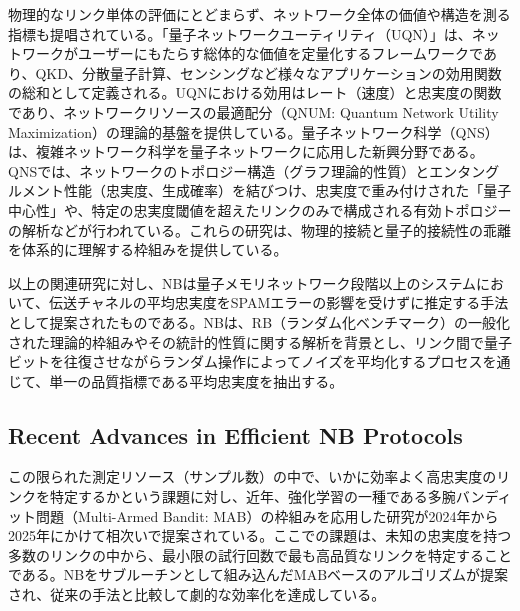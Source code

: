 \documentclass[12pt,a4paper,titlepage,dvipdfmx]{article}
\begin{document}
物理的なリンク単体の評価にとどまらず、ネットワーク全体の価値や構造を測る指標も提唱されている。「量子ネットワークユーティリティ（UQN）」は、ネットワークがユーザーにもたらす総体的な価値を定量化するフレームワークであり、QKD、分散量子計算、センシングなど様々なアプリケーションの効用関数の総和として定義される。UQN\cite{vardoyan2024quantum}における効用はレート（速度）と忠実度の関数であり、ネットワークリソースの最適配分（QNUM: Quantum Network Utility Maximization）の理論的基盤を提供している。量子ネットワーク科学（QNS）は、複雑ネットワーク科学を量子ネットワークに応用した新興分野である\cite{biamonte2019complex}。QNSでは、ネットワークのトポロジー構造（グラフ理論的性質）とエンタングルメント性能（忠実度、生成確率）を結びつけ、忠実度で重み付けされた「量子中心性」や、特定の忠実度閾値を超えたリンクのみで構成される有効トポロジーの解析などが行われている\cite{cuquet2009entanglement}。これらの研究は、物理的接続と量子的接続性の乖離を体系的に理解する枠組みを提供している。

以上の関連研究に対し、NBは量子メモリネットワーク段階以上のシステムにおいて、伝送チャネルの平均忠実度をSPAMエラーの影響を受けずに推定する手法として提案されたものである\cite{helsen2023benchmarking}。NBは、RB（ランダム化ベンチマーク）の一般化された理論的枠組み\cite{helsen2022general}やその統計的性質に関する解析\cite{harper2019statistical}を背景とし、リンク間で量子ビットを往復させながらランダム操作によってノイズを平均化するプロセスを通じて、単一の品質指標である平均忠実度を抽出する。

\subsection{Recent Advances in Efficient NB Protocols}
この限られた測定リソース（サンプル数）の中で、いかに効率よく高忠実度のリンクを特定するかという課題に対し、近年、強化学習の一種である多腕バンディット問題（Multi-Armed Bandit: MAB）の枠組みを応用した研究が2024年から2025年にかけて相次いで提案されている\cite{liu2024linkselfie, wang2025learning, li2025fortuna}。ここでの課題は、未知の忠実度を持つ多数のリンクの中から、最小限の試行回数で最も高品質なリンクを特定することである。NBをサブルーチンとして組み込んだMABベースのアルゴリズムが提案され、従来の手法と比較して劇的な効率化を達成している。
\end{document}
